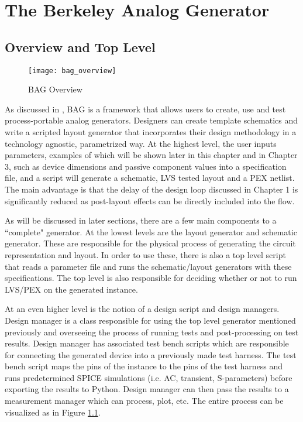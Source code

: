 \chapter{The Berkeley Analog Generator}

\section{Overview and Top Level}
\begin{figure}[h]
\centering
\texttt{[image: bag\_overview]}
\caption{BAG Overview}
\label{fig:bag_top_level}
\end{figure}
As discussed in \cite{chang_bag2:_2018}, BAG is a framework that allows users to create, use and test process-portable analog generators. Designers can create template schematics and write a scripted layout generator that incorporates their design methodology in a technology agnostic, parametrized way. At the highest level, the user inputs parameters, examples of which will be shown later in this chapter and in Chapter 3, such as device dimensions and passive component values into a specification file, and a script will generate a schematic, LVS tested layout and a PEX netlist. The main advantage is that the delay of the design loop discussed in Chapter 1 is significantly reduced as post-layout effects can be directly included into the flow. 

As will be discussed in later sections, there are a few main components to a ``complete" generator. At the lowest levels are the layout generator and schematic generator. These are responsible for the physical process of generating the circuit representation and layout. In order to use these, there is also a top level script that reads a parameter file and runs the schematic/layout generators with these specifications. The top level is also responsible for deciding whether or not to run LVS/PEX on the generated instance.

At an even higher level is the notion of a design script and design managers. Design manager is a class responsible for using the top level generator mentioned previously and overseeing the process of running tests and post-processing on test results. Design manager has associated test bench scripts which are responsible for connecting the generated device into a previously made test harness. The test bench script maps the pins of the instance to the pins of the test harness and runs predetermined SPICE simulations (i.e. AC, transient, S-parameters) before exporting the results to Python. Design manager can then pass the results to a measurement manager which can process, plot, etc. The entire process can be visualized as in Figure \ref{fig:bag_top_level}.

